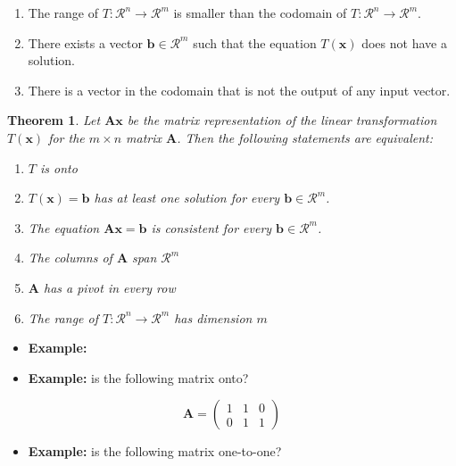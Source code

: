 \documentclass[
]{book}
\providecommand{\tightlist}{%
  \setlength{\itemsep}{0pt}\setlength{\parskip}{0pt}}
\newtheorem{theorem}{Theorem}[chapter]
\theoremstyle{definition}
\theoremstyle{definition}
\theoremstyle{definition}
\theoremstyle{definition}
\theoremstyle{remark}
\begin{document}
\begin{enumerate}
\def\labelenumi{\arabic{enumi})}
\item
  The range of \(T:\mathcal{R}^n \rightarrow \mathcal{R}^m\) is smaller than the codomain of \(T:\mathcal{R}^n \rightarrow \mathcal{R}^m\).
\item
  There exists a vector \(\mathbf{b} \in \mathcal{R}^m\) such that the equation \(T(\mathbf{x})\) does not have a solution.
\item
  There is a vector in the codomain that is not the output of any input vector.
\end{enumerate}

\begin{theorem}

Let \(\mathbf{A}\mathbf{x}\) be the matrix representation of the linear transformation \(T(\mathbf{x})\) for the \(m \times n\) matrix \(\mathbf{A}\). Then the following statements are equivalent:

\begin{enumerate}
\def\labelenumi{\arabic{enumi})}
\item
  \(T\) is onto
\item
  \(T(\mathbf{x}) = \mathbf{b}\) has at least one solution for every \(\mathbf{b} \in \mathcal{R}^m\).
\item
  The equation \(\mathbf{A}\mathbf{x} = \mathbf{b}\) is consistent for every \(\mathbf{b} \in \mathcal{R}^m\).
\item
  The columns of \(\mathbf{A}\) span \(\mathcal{R}^m\)
\item
  \(\mathbf{A}\) has a pivot in every row
\item
  The range of \(T:\mathcal{R}^n \rightarrow \mathcal{R}^m\) has dimension \(m\)
\end{enumerate}

\end{theorem}

\begin{itemize}
\item
  \textbf{Example:}
\item
  \textbf{Example:} is the following matrix onto?
\end{itemize}

\[
\mathbf{A} = \begin{pmatrix}
1 & 1 & 0 \\
0 & 1 & 1
\end{pmatrix}
\]

\begin{itemize}
\tightlist
\item
  \textbf{Example:} is the following matrix one-to-one?
\end{itemize}
\end{document}
